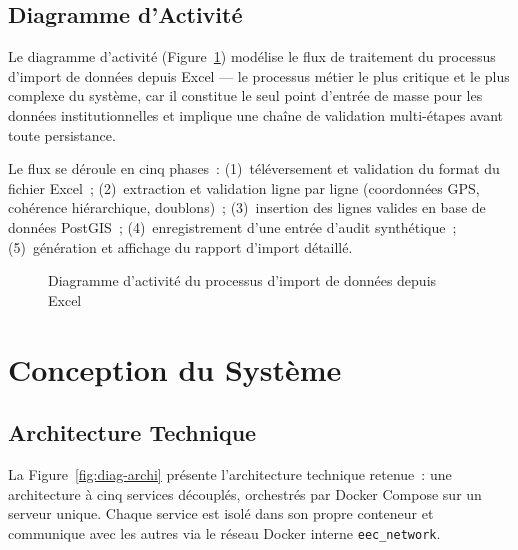 \documentclass[12pt, a4paper]{report}
\begin{document}
\subsection{Diagramme d'Activité}
\label{ssec:activite}

Le diagramme d'activité (Figure~\ref{fig:diag-activite}) modélise le flux de
traitement du processus d'import de données depuis Excel --- le processus métier
le plus critique et le plus complexe du système, car il constitue le seul point
d'entrée de masse pour les données institutionnelles et implique une chaîne de
validation multi-étapes avant toute persistance.

Le flux se déroule en cinq phases~: (1)~téléversement et validation du format
du fichier Excel~; (2)~extraction et validation ligne par ligne (coordonnées GPS,
cohérence hiérarchique, doublons)~; (3)~insertion des lignes valides en base de
données PostGIS~; (4)~enregistrement d'une entrée d'audit synthétique~;
(5)~génération et affichage du rapport d'import détaillé.

\begin{figure}[H]
  \centering
  \caption{Diagramme d'activité du processus d'import de données depuis Excel}
  \label{fig:diag-activite}
\end{figure}

\section{Conception du Système}
\label{sec:conception}

\subsection{Architecture Technique}
\label{ssec:archi}

La Figure~\ref{fig:diag-archi} présente l'architecture technique retenue~: une
architecture à cinq services découplés, orchestrés par Docker Compose sur un
serveur unique. Chaque service est isolé dans son propre conteneur et communique
avec les autres via le réseau Docker interne \texttt{eec\_network}.
\end{document}
